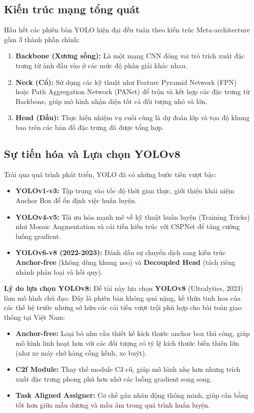 \subsection{Kiến trúc mạng tổng quát}

Hầu hết các phiên bản YOLO hiện đại đều tuân theo kiến trúc Meta-architecture gồm 3 thành phần chính:
\begin{enumerate}
    \item \textbf{Backbone (Xương sống):} Là một mạng CNN đóng vai trò trích xuất đặc trưng từ ảnh đầu vào ở các mức độ phân giải khác nhau.
    \item \textbf{Neck (Cổ):} Sử dụng các kỹ thuật như Feature Pyramid Network (FPN) hoặc Path Aggregation Network (PANet) để trộn và kết hợp các đặc trưng từ Backbone, giúp mô hình nhận diện tốt cả đối tượng nhỏ và lớn.
    \item \textbf{Head (Đầu):} Thực hiện nhiệm vụ cuối cùng là dự đoán lớp và tọa độ khung bao trên các bản đồ đặc trưng đã được tổng hợp.
\end{enumerate}

\subsection{Sự tiến hóa và Lựa chọn YOLOv8}
Trải qua quá trình phát triển, YOLO đã có những bước tiến vượt bậc:
\begin{itemize}
    \item \textbf{YOLOv1-v3:} Tập trung vào tốc độ thời gian thực, giới thiệu khái niệm Anchor Box để ổn định việc huấn luyện.
    \item \textbf{YOLOv4-v5:} Tối ưu hóa mạnh mẽ về kỹ thuật huấn luyện (Training Tricks) như Mosaic Augmentation và cải tiến kiến trúc với CSPNet để tăng cường luồng gradient.
    \item \textbf{YOLOv6-v8 (2022-2023):} Đánh dấu sự chuyển dịch sang kiến trúc \textbf{Anchor-free} (không dùng khung neo) và \textbf{Decoupled Head} (tách riêng nhánh phân loại và hồi quy).
\end{itemize}

\textbf{Lý do lựa chọn YOLOv8:}
Đề tài này lựa chọn \textbf{YOLOv8} (Ultralytics, 2023) làm mô hình chủ đạo. Đây là phiên bản không quá nặng, kế thừa tinh hoa của các thế hệ trước nhưng sở hữu các cải tiến vượt trội phù hợp cho bài toán giao thông tại Việt Nam:
\begin{itemize}
    \item \textbf{Anchor-free:} Loại bỏ nhu cầu thiết kế kích thước anchor box thủ công, giúp mô hình linh hoạt hơn với các đối tượng có tỷ lệ kích thước biến thiên lớn (như xe máy chở hàng cồng kềnh, xe buýt).
    \item \textbf{C2f Module:} Thay thế module C3 cũ, giúp mô hình nhẹ hơn nhưng trích xuất đặc trưng phong phú hơn nhờ các luồng gradient song song.
    \item \textbf{Task Aligned Assigner:} Cơ chế gán nhãn động thông minh, giúp cân bằng tốt hơn giữa mẫu dương và mẫu âm trong quá trình huấn luyện.
\end{itemize}

